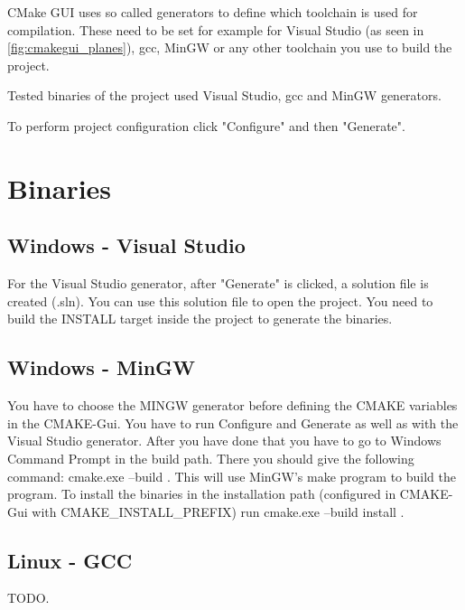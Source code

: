 CMake GUI uses so called generators to define which toolchain is used for compilation. These need to be set for example for Visual Studio (as seen in \ref{fig:cmakegui_planes}), gcc, MinGW or any other toolchain you use to build the project.

Tested binaries of the project used Visual Studio, gcc and MinGW generators.

To perform project configuration click "Configure" and then "Generate".

\section {Binaries}

\subsection{Windows - Visual Studio}

For the Visual Studio generator, after "Generate" is clicked, a solution file is created (.sln). You can use this solution file to open the project. You need to build the INSTALL target inside the project to generate the binaries. 

\subsection {Windows - MinGW} 

You have to choose the MINGW generator before defining the CMAKE variables in the CMAKE-Gui. You have to run Configure and Generate as well as with the Visual Studio generator. After you have done that you have to go to Windows Command Prompt in the build path. There you should give the following command: cmake.exe --build . This will use MinGW's make program to build the program. To install the binaries in the installation path (configured in CMAKE-Gui with CMAKE\_INSTALL\_PREFIX) run cmake.exe --build install .

\subsection {Linux - GCC}

TODO.